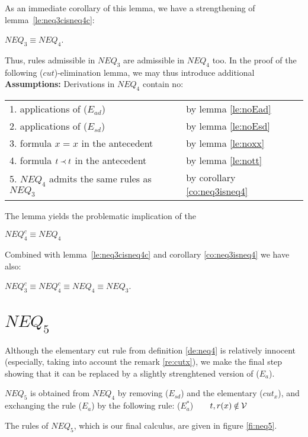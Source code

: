 %
\noindent
As an immediate corollary of this lemma, we have a strengthening of 
lemma~\ref{le:neq3cisneq4c}: 
\begin{COROLLARY}\label{co:neq3isneq4}
$NEQ_3\equiv NEQ_4$.
\end{COROLLARY}
Thus, rules admissible in $NEQ_3$ are admissible in $NEQ_4$ too.
In the proof of the following ($cut$)-elimination lemma, 
we may thus introduce additional
\\[1ex]
\noindent
{\bf Assumptions:} Derivations in $NEQ_4$ contain no:

\begin{tabular}{ll}
1. applications of ($E_{ad}$) & by lemma \ref{le:noEad} \\
2. applications of ($E_{sd}$) & by lemma \ref{le:noEsd} \\
3. formula $x=x$ in the antecedent & by lemma \ref{le:noxx} \\
4. formula $t\mathbin{\prec} t$ in the antecedent & by lemma \ref{le:nott} \\
5. $NEQ_4$ admits the same rules as $NEQ_3$ & by corollary \ref{co:neq3isneq4}
\end{tabular} 


%
\noindent
The lemma yields the problematic implication of the 
\begin{THEOREM}\label{th:neq4cisneq4}
 $NEQ_4^c \equiv NEQ_4$ \end{THEOREM}
Combined with lemma~\ref{le:neq3cisneq4c} and corollary \ref{co:neq3isneq4} 
we have also:
\begin{COROLLARY}
$NEQ_3^c \equiv NEQ_4^c \equiv NEQ_4 \equiv NEQ_3$.
\end{COROLLARY}

\section{$NEQ_5$}
Although the elementary cut rule  from definition \ref{de:neq4}
is relatively innocent (especially, taking into account the remark
\ref{re:cutx}), we make the final step showing that it can be replaced by a
slightly strenghtened version of ($E_a$).
\begin{DEFINITION}\label{de:neq5}
 $NEQ_5$ is obtained from $NEQ_4$ by removing ($E_{sd}$) and the elementary
 ($cut_x$), and exchanging the rule ($E_a$) by the following rule:
 ($E_a^*$)\ \ \ \ $t,r(x)\not\in\Vars$
\end{DEFINITION}
The rules of $NEQ_5$, which is our final calculus, are given in figure \ref{fi:neq5}.

